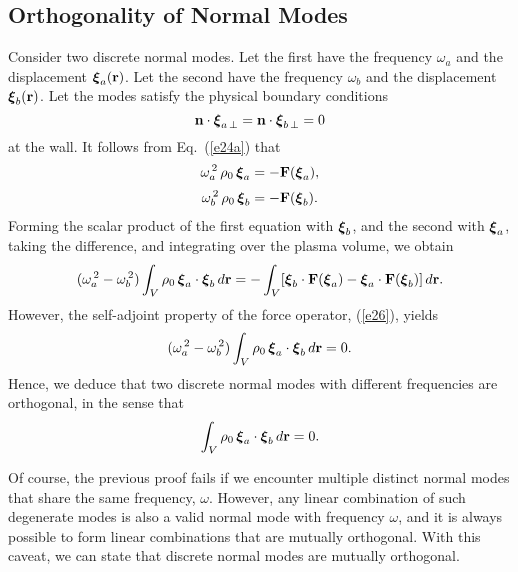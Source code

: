 \documentclass[12pt,prb,aps,notitlepage]{revtex4-1}
\newcommand{\bxi}{\mbox{\boldmath$\xi$}}
\begin{document}
\subsection{Orthogonality of Normal Modes}\label{orth}
Consider two discrete normal modes. Let the first have the frequency $\omega_a$ and the displacement $\bxi_a({\bf r})$. Let the
second have the frequency $\omega_b$ and the displacement $\bxi_b({\bf r})$. Let the modes satisfy the
physical boundary conditions 
\begin{equation}\label{e91}
{\bf n}\cdot\bxi_{a\,\perp}={\bf n}\cdot\bxi_{b\,\perp} = 0
\end{equation}
at the wall. It follows from Eq.~(\ref{e24a}) that
\begin{align}
\omega_a^{\,2}\,\rho_0\,\bxi_a &= -{\bf F}(\bxi_a),\\[0.5ex]
\omega_b^{\,2}\,\rho_0\,\bxi_b &=- {\bf F}(\bxi_b).
\end{align}
Forming the scalar product of the first equation with $\bxi_b$, and the second with $\bxi_a$, taking the difference, and integrating over the
plasma volume, we obtain
\begin{equation}
(\omega_a^{\,2}-\omega_b^{\,2})\int_V \rho_0\,\bxi_a\cdot\bxi_b\,d{\bf r} = - \int_V [\bxi_b\cdot {\bf F}(\bxi_a)-\bxi_a\cdot {\bf F}(\bxi_b)]\,d{\bf r}.
\end{equation}
However, the self-adjoint property of the force operator, (\ref{e26}), yields
\begin{equation}
(\omega_a^{\,2}-\omega_b^{\,2})\int_V \rho_0\,\bxi_a\cdot\bxi_b\,d{\bf r}=0.
\end{equation}
Hence, we deduce that two discrete normal modes with different frequencies are {\rm orthogonal}, in the sense that 
\begin{equation}
\int_V \rho_0\,\bxi_a\cdot\bxi_b\,d{\bf r}=0.
\end{equation}

Of course, the previous proof fails if we encounter multiple  distinct normal modes that share the same frequency, $\omega$. However, any
linear combination of such degenerate modes is also a valid normal mode with frequency $\omega$, and it is always possible to form linear
combinations that are mutually orthogonal. With this caveat, we can state that discrete normal modes are mutually orthogonal. 
\end{document}
